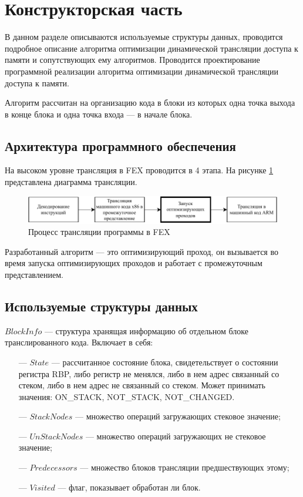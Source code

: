 \section{Конструкторская часть}

В данном разделе описываются используемые структуры данных, проводится подробное описание алгоритма оптимизации динамической трансляции доступа к памяти и сопутствующих ему алгоритмов. Проводится проектирование программной реализации алгоритма оптимизации динамической трансляции доступа к памяти.

Алгоритм рассчитан на организацию кода в блоки из которых одна точка выхода в конце блока и одна точка входа --- в начале блока.

\subsection{Архитектура программного обеспечения}

На высоком уровне трансляция в FEX проводится в 4 этапа. На рисунке \ref{fig:trans} представлена диаграмма трансляции.

\begin{figure}[hbtp]
	\centering
	\includegraphics[width=\textwidth]{img/scale.pdf}
	\caption{Процесс трансляции программы в FEX}
	\label{fig:trans}
\end{figure}

Разработанный алгоритм --- это оптимизирующий проход, он вызывается во время запуска оптимизирующих проходов и работает с промежуточным представлением.

\subsection{Используемые структуры данных}

$BlockInfo$ --- структура хранящая информацию об отдельном блоке транслированного кода. Включает в себя:

\begin{itemize}[leftmargin=1.6\parindent]
	\item[---] $State$ --- рассчитанное состояние блока, свидетельствует о состоянии регистра RBP, либо регистр не менялся, либо в нем адрес связанный со стеком, либо в нем адрес не связанный со стеком. Может принимать значения: ON\_STACK, NOT\_STACK, NOT\_CHANGED.
	\item[---] $StackNodes$ --- множество операций загружающих стековое значение;
	\item[---] $UnStackNodes$ --- множество операций загружающих не стековое значение;
	\item[---] $Predecessors$ --- множество блоков трансляции предшествующих этому;
	\item[---] $Visited$ --- флаг, показывает обработан ли блок.
\end{itemize}

